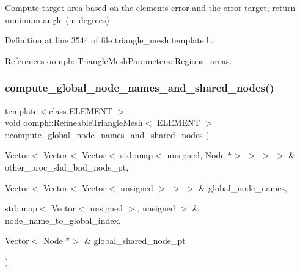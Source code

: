 Compute target area based on the element\textquotesingle{}s error and the error target; return minimum angle (in degrees) 



Definition at line 3544 of file triangle\+\_\+mesh.\+template.\+h.



References oomph\+::\+Triangle\+Mesh\+Parameters\+::\+Regions\+\_\+areas.

\mbox{\label{classoomph_1_1RefineableTriangleMesh_a6f98720e48868896fd4360ee10ebdd09}} 
\subsubsection{\texorpdfstring{compute\+\_\+global\+\_\+node\+\_\+names\+\_\+and\+\_\+shared\+\_\+nodes()}{compute\_global\_node\_names\_and\_shared\_nodes()}}
{\footnotesize\ttfamily template$<$class E\+L\+E\+M\+E\+NT $>$ \\
void \hyperlink{classoomph_1_1RefineableTriangleMesh}{oomph\+::\+Refineable\+Triangle\+Mesh}$<$ E\+L\+E\+M\+E\+NT $>$\+::compute\+\_\+global\+\_\+node\+\_\+names\+\_\+and\+\_\+shared\+\_\+nodes (\begin{DoxyParamCaption}\item[{Vector$<$ Vector$<$ Vector$<$ std\+::map$<$ unsigned, Node $\ast$$>$ $>$ $>$ $>$ \&}]{other\+\_\+proc\+\_\+shd\+\_\+bnd\+\_\+node\+\_\+pt,  }\item[{Vector$<$ Vector$<$ Vector$<$ unsigned $>$ $>$ $>$ \&}]{global\+\_\+node\+\_\+names,  }\item[{std\+::map$<$ Vector$<$ unsigned $>$, unsigned $>$ \&}]{node\+\_\+name\+\_\+to\+\_\+global\+\_\+index,  }\item[{Vector$<$ Node $\ast$$>$ \&}]{global\+\_\+shared\+\_\+node\+\_\+pt }\end{DoxyParamCaption})\hspace{0.3cm}{\ttfamily [protected]}}



